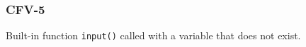 \subsubsection{CFV-5}\label{sec:error_code_cfv_5}

Built-in function \texttt{input()} called with a variable that does not exist.


